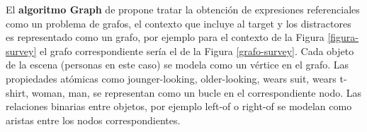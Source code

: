 %





El {\bf algoritmo Graph} de \cite{Krahmer:2003} propone tratar la obtenci\'on de expresiones referenciales como un problema de grafos, el contexto que incluye al target y los distractores es representado como un grafo, por ejemplo para el contexto de la Figura \ref{figura-survey} el grafo correspondiente ser\'ia el de la Figura \ref{grafo-survey}. Cada objeto de la escena (personas en este caso) se modela como un v\'ertice en el grafo. Las propiedades at\'omicas como jounger-looking, older-looking, wears suit, wears t-shirt, woman, man, se representan como un bucle en el correspondiente nodo. Las relaciones binarias entre objetos, por ejemplo left-of o right-of se modelan como aristas entre los nodos correspondientes.

